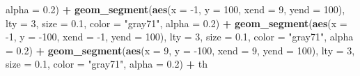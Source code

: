\documentclass[10pt,]{scrartcl}
\newenvironment{Shaded}{\begin{snugshade}}{\end{snugshade}}
\newcommand{\KeywordTok}[1]{\textcolor[rgb]{0.13,0.29,0.53}{\textbf{#1}}}
\newcommand{\DataTypeTok}[1]{\textcolor[rgb]{0.13,0.29,0.53}{#1}}
\newcommand{\DecValTok}[1]{\textcolor[rgb]{0.00,0.00,0.81}{#1}}
\newcommand{\FloatTok}[1]{\textcolor[rgb]{0.00,0.00,0.81}{#1}}
\newcommand{\StringTok}[1]{\textcolor[rgb]{0.31,0.60,0.02}{#1}}
\newcommand{\OperatorTok}[1]{\textcolor[rgb]{0.81,0.36,0.00}{\textbf{#1}}}
\newcommand{\NormalTok}[1]{#1}
\begin{document}
\begin{Shaded}
\begin{Highlighting}[]
    \DataTypeTok{alpha =} \FloatTok{0.2}\NormalTok{) }\OperatorTok{+}\StringTok{ }\KeywordTok{geom_segment}\NormalTok{(}\KeywordTok{aes}\NormalTok{(}\DataTypeTok{x =} \DecValTok{-1}\NormalTok{, }\DataTypeTok{y =} \DecValTok{100}\NormalTok{, }\DataTypeTok{xend =} \DecValTok{9}\NormalTok{,}
    \DataTypeTok{yend =} \DecValTok{100}\NormalTok{), }\DataTypeTok{lty =} \DecValTok{3}\NormalTok{, }\DataTypeTok{size =} \FloatTok{0.1}\NormalTok{, }\DataTypeTok{color =} \StringTok{"gray71"}\NormalTok{, }\DataTypeTok{alpha =} \FloatTok{0.2}\NormalTok{) }\OperatorTok{+}
\StringTok{    }\KeywordTok{geom_segment}\NormalTok{(}\KeywordTok{aes}\NormalTok{(}\DataTypeTok{x =} \DecValTok{-1}\NormalTok{, }\DataTypeTok{y =} \DecValTok{-100}\NormalTok{, }\DataTypeTok{xend =} \DecValTok{-1}\NormalTok{, }\DataTypeTok{yend =} \DecValTok{100}\NormalTok{),}
        \DataTypeTok{lty =} \DecValTok{3}\NormalTok{, }\DataTypeTok{size =} \FloatTok{0.1}\NormalTok{, }\DataTypeTok{color =} \StringTok{"gray71"}\NormalTok{, }\DataTypeTok{alpha =} \FloatTok{0.2}\NormalTok{) }\OperatorTok{+}
\StringTok{    }\KeywordTok{geom_segment}\NormalTok{(}\KeywordTok{aes}\NormalTok{(}\DataTypeTok{x =} \DecValTok{9}\NormalTok{, }\DataTypeTok{y =} \DecValTok{-100}\NormalTok{, }\DataTypeTok{xend =} \DecValTok{9}\NormalTok{, }\DataTypeTok{yend =} \DecValTok{100}\NormalTok{),}
        \DataTypeTok{lty =} \DecValTok{3}\NormalTok{, }\DataTypeTok{size =} \FloatTok{0.1}\NormalTok{, }\DataTypeTok{color =} \StringTok{"gray71"}\NormalTok{, }\DataTypeTok{alpha =} \FloatTok{0.2}\NormalTok{) }\OperatorTok{+}
\StringTok{    }\NormalTok{th}



\end{Highlighting}
\end{Shaded}
\end{document}
